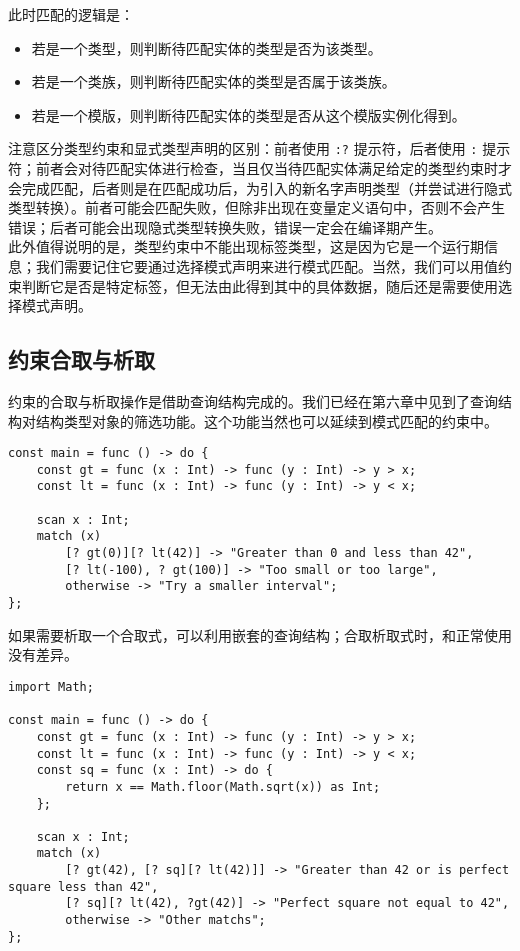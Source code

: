 此时匹配的逻辑是：

\begin{itemize}
    \item 若是一个类型，则判断待匹配实体的类型是否为该类型。
    \item 若是一个类族，则判断待匹配实体的类型是否属于该类族。
    \item 若是一个模版，则判断待匹配实体的类型是否从这个模版实例化得到。
\end{itemize}

注意区分类型约束和显式类型声明的区别：前者使用 \lstinline!:?! 提示符，后者使用 \lstinline!:! 提示符；前者会对待匹配实体进行检查，当且仅当待匹配实体满足给定的类型约束时才会完成匹配，后者则是在匹配成功后，为引入的新名字声明类型（并尝试进行隐式类型转换）。前者可能会匹配失败，但除非出现在变量定义语句中，否则不会产生错误；后者可能会出现隐式类型转换失败，错误一定会在编译期产生。 \\

此外值得说明的是，类型约束中不能出现标签类型，这是因为它是一个运行期信息；我们需要记住它要通过选择模式声明来进行模式匹配。当然，我们可以用值约束判断它是否是特定标签，但无法由此得到其中的具体数据，随后还是需要使用选择模式声明。

\subsection{约束合取与析取}

约束的合取与析取操作是借助查询结构完成的。我们已经在第六章中见到了查询结构对结构类型对象的筛选功能。这个功能当然也可以延续到模式匹配的约束中。

\begin{lstlisting}
const main = func () -> do {
	const gt = func (x : Int) -> func (y : Int) -> y > x;
	const lt = func (x : Int) -> func (y : Int) -> y < x;
	
	scan x : Int;
	match (x)
		[? gt(0)][? lt(42)] -> "Greater than 0 and less than 42",
		[? lt(-100), ? gt(100)] -> "Too small or too large",
		otherwise -> "Try a smaller interval";
};
\end{lstlisting}

如果需要析取一个合取式，可以利用嵌套的查询结构；合取析取式时，和正常使用没有差异。

\begin{lstlisting}
import Math;

const main = func () -> do {
	const gt = func (x : Int) -> func (y : Int) -> y > x;
	const lt = func (x : Int) -> func (y : Int) -> y < x;
	const sq = func (x : Int) -> do {
		return x == Math.floor(Math.sqrt(x)) as Int;
	};

	scan x : Int;
	match (x)
		[? gt(42), [? sq][? lt(42)]] -> "Greater than 42 or is perfect square less than 42",
		[? sq][? lt(42), ?gt(42)] -> "Perfect square not equal to 42",
		otherwise -> "Other matchs";
};
\end{lstlisting}

